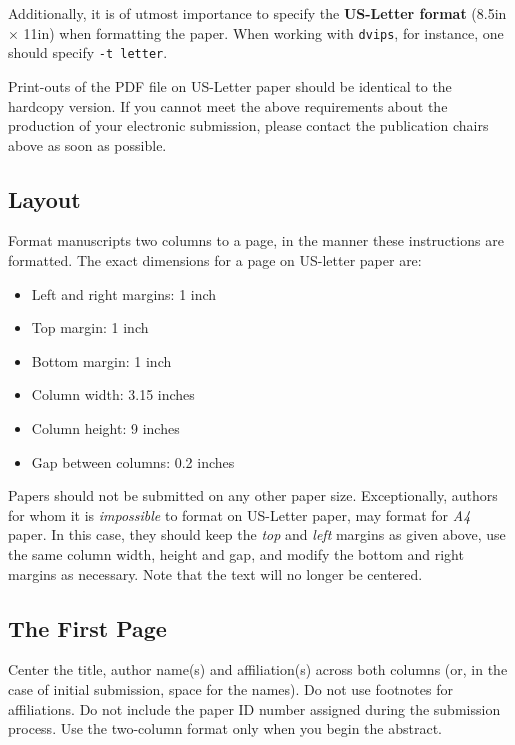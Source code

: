 \documentclass[11pt,letterpaper]{article}
\begin{document}
Additionally, it is of utmost importance to specify the {\bf
  US-Letter format} (8.5in $\times$ 11in) when formatting the paper.
When working with {\small\tt dvips}, for instance, one should specify {\small\tt -t letter}.

Print-outs of the PDF file on US-Letter paper should be identical to the
hardcopy version.  If you cannot meet the above requirements about the
production of your electronic submission, please contact the
publication chairs above  as soon as possible.

\subsection{Layout}
\label{ssec:layout}

Format manuscripts two columns to a page, in the manner these
instructions are formatted. The exact dimensions for a page on US-letter
paper are:

\begin{itemize}
\item Left and right margins: 1 inch
\item Top margin: 1 inch
\item Bottom margin: 1 inch
\item Column width: 3.15 inches
\item Column height: 9 inches
\item Gap between columns: 0.2 inches
\end{itemize}

\noindent Papers should not be submitted on any other paper size. Exceptionally,
authors for whom it is \emph{impossible} to format on US-Letter paper,
may format for \emph{A4} paper. In this case, they should keep the \emph{top}
and \emph{left} margins as given above, use the same column width,
height and gap, and modify the bottom and right margins as necessary.
Note that the text will no longer be centered.

\subsection{The First Page}
\label{ssec:first}

Center the title, author name(s) and affiliation(s) across both
columns (or, in the case of initial submission, space for the names). 
Do not use footnotes for affiliations.  Do not include the
paper ID number assigned during the submission process. 
Use the two-column format only when you begin the abstract.
\end{document}
